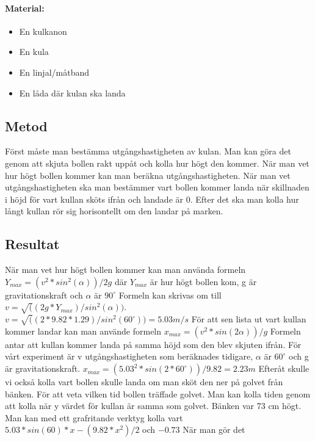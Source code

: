 \documentclass[11p]{article}
\begin{document}
    \paragraph{Material:}
    \begin{itemize}
        \item En kulkanon
        \item En kula
        \item En linjal/måtband
        \item En låda där kulan ska landa
    \end{itemize}
    \subsection{Metod}
    Först måste man bestämma utgångshastigheten av kulan.
    Man kan göra det genom att skjuta bollen rakt uppåt och kolla hur högt den kommer.
    När man vet hur högt bollen kommer kan man beräkna utgångshastigheten.
    När man vet utgångshastigheten ska man bestämmer vart bollen kommer landa när skillnaden i höjd för vart kullan sköts ifrån och landade är 0.
    Efter det ska man kolla hur långt kullan rör sig horisontellt om den landar på marken.

    \subsection{Resultat}
    När man vet hur högt bollen kommer kan man använda formeln $Y_{max}=(v^2 * sin^2(\alpha))/2g$ där $Y_{max}$ är hur högt bollen kom, g är gravitationskraft och $\alpha$ är $90^{\circ}$
    Formeln kan skrivas om till $v=\sqrt((2g*Y_{max})/sin^2(\alpha))$.
    \newline $v=\sqrt((2*9.82*1.29)/sin^2(60^{\circ})) = 5.03 m/s$
    \newline\newline
    För att sen lista ut vart kullan kommer landar kan man använde formeln $x_{max}=(v^2*sin(2\alpha))/g$
    Formeln antar att kullan kommer landa på samma höjd som den blev skjuten ifrån.
    För vårt experiment är v utgångshastigheten som beräknades tidigare, $\alpha$ är $60^{\circ}$ och g är gravitationskraft.
    \newline $x_{max}=(5.03^2*sin(2*60^{\circ}))/9.82 = 2.23 m$
    \newline\newline
    Efteråt skulle vi också kolla vart bollen skulle landa om man sköt den ner på golvet från bänken.
    För att veta vilken tid bollen träffade golvet.
    Man kan kolla tiden genom att kolla när y värdet för kullan är samma som golvet.
    Bänken var 73 cm högt.
    Man kan med ett grafritande verktyg kolla vart $5.03*sin(60)*x-(9.82*x^2)/2$ och $-0.73$
    När man gör det
\end{document}
